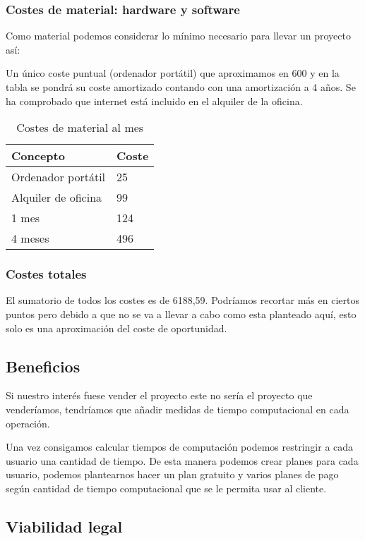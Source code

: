 \subsubsection{Costes de material: hardware y software}

Como material podemos considerar lo mínimo necesario para llevar un proyecto así:

Un único coste puntual (ordenador portátil) que aproximamos en 600 y en la tabla se pondrá su coste amortizado contando con una amortización a 4 años. Se ha comprobado que internet está incluido en el alquiler de la oficina.

\begin{table}[]
\centering
\begin{tabular}{@{}ll@{}}
\toprule
Concepto & Coste \\ \midrule
Ordenador portátil & 25 \\
Alquiler de oficina & 99 \\
1 mes & 124 \\ \midrule
4 meses  & 496 \\ \bottomrule
\end{tabular}
\caption{Costes de material al mes}
\label{Costes mensualmente}
\end{table}


\subsubsection{Costes totales}
El sumatorio de todos los costes es de 6188,59. Podríamos recortar más en ciertos puntos pero debido a que no se va a llevar a cabo como esta planteado aquí, esto solo es una aproximación del coste de oportunidad.




\subsection{Beneficios}
Si nuestro interés fuese vender el proyecto este no sería el proyecto que venderíamos, tendríamos que añadir medidas de tiempo computacional en cada operación.

Una vez consigamos calcular tiempos de computación podemos restringir a cada usuario una cantidad de tiempo. De esta manera podemos crear planes para cada usuario, podemos plantearnos hacer un plan gratuito y varios planes de pago según cantidad de tiempo computacional que se le permita usar al cliente. 


\subsection{Viabilidad legal}

